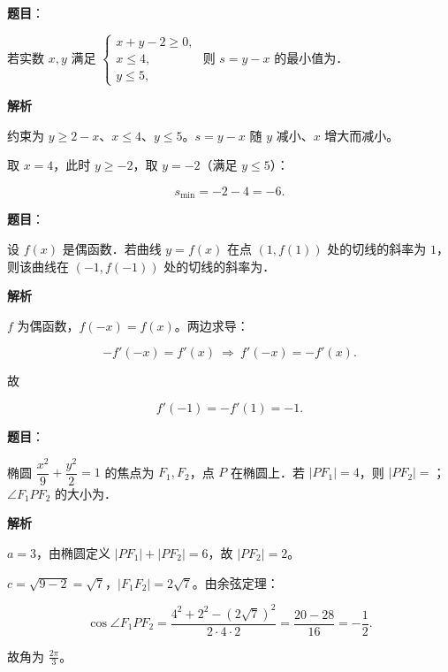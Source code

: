 \begin{answer}

\textbf{题目}：

若实数 $x,y$ 满足 $\begin{cases}x+y-2\geqslant0,\\ x\leqslant4,\\ y\leqslant5,\end{cases}$ 则 $s=y-x$ 的最小值为\gkblank{}．

\textbf{解析}

约束为 $y\geqslant2-x$、$x\leqslant4$、$y\leqslant5$。$s=y-x$ 随 $y$ 减小、$x$ 增大而减小。

取 $x=4$，此时 $y\geqslant-2$，取 $y=-2$（满足 $y\leqslant5$）：

\nopagebreak[4]
\[s_{\min}=-2-4=-6 .\]


\end{answer}
\begin{answer}

\textbf{题目}：

设 $f(x)$ 是偶函数．若曲线 $y=f(x)$ 在点 $(1,f(1))$ 处的切线的斜率为 $1$，则该曲线在 $(-1,f(-1))$ 处的切线的斜率为\gkblank{}．

\textbf{解析}

$f$ 为偶函数，$f(-x)=f(x)$。两边求导：

\nopagebreak[4]
\[-f'(-x)=f'(x)\ \Longrightarrow\ f'(-x)=-f'(x).\]

故

\nopagebreak[4]
\[f'(-1)=-f'(1)=-1 .\]


\end{answer}
\begin{answer}

\textbf{题目}：

椭圆 $\dfrac{x^2}{9}+\dfrac{y^2}{2}=1$ 的焦点为 $F_1,F_2$，点 $P$ 在椭圆上．若 $|PF_1|=4$，则 $|PF_2|=$\gkblank{}；$\angle F_1PF_2$ 的大小为\gkblank{}．

\textbf{解析}

$a=3$，由椭圆定义 $|PF_1|+|PF_2|=6$，故 $|PF_2|=2$。

$c=\sqrt{9-2}=\sqrt7$，$|F_1F_2|=2\sqrt7$。由余弦定理：

\nopagebreak[4]
\[\cos\angle F_1PF_2=\frac{4^2+2^2-(2\sqrt7)^2}{2\cdot4\cdot2}
=\frac{20-28}{16}=-\frac12 .\]

故角为 $\frac{2\pi}{3}$。


\end{answer}
